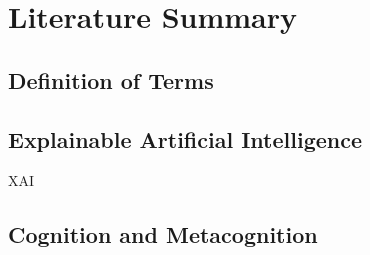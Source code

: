 \section{Literature Summary} \label{sec:literature_summary}

\subsection{Definition of Terms} \label{ssec:definition_of_terms}

\subsection{Explainable Artificial Intelligence} \label{ssec:xai}

\ac{XAI}

\subsection{Cognition and Metacognition} \label{ssec:cognition_and_metacognition}
